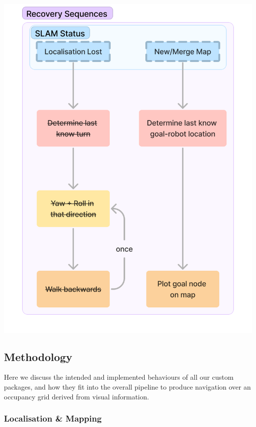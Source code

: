 \documentclass[10pt,english]{article}
\begin{document}
\begin{center}
\includegraphics[width=\textwidth]{images/Recovery Sequences.png}
\end{center}


\clearpage

\subsection*{Methodology}


Here we discuss the intended and implemented behaviours of all our custom packages, and how they fit into the overall pipeline to produce navigation over an occupancy grid derived from visual information.

\subsubsection*{Localisation \& Mapping}
\end{document}
